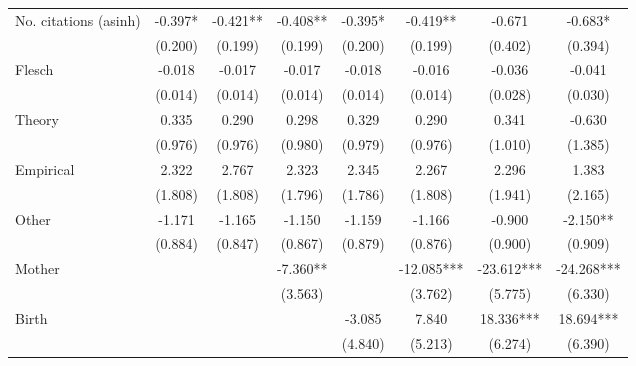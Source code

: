 \begin{table}
\begin{adjustwidth}{-0.085cm}{}
\begin{threeparttable}
\begin{tabular}{p{2.64cm}SSSSSSS}
            No. citations (asinh)         &      -0.397*  &      -0.421** &      -0.408** &      -0.395*  &      -0.419** &      -0.671   &      -0.683*  \\
                                          &     (0.200)   &     (0.199)   &     (0.199)   &     (0.200)   &     (0.199)   &     (0.402)   &     (0.394)   \\
            Flesch                        &      -0.018   &      -0.017   &      -0.017   &      -0.018   &      -0.016   &      -0.036   &      -0.041   \\
                                          &     (0.014)   &     (0.014)   &     (0.014)   &     (0.014)   &     (0.014)   &     (0.028)   &     (0.030)   \\
            Theory                        &       0.335   &       0.290   &       0.298   &       0.329   &       0.290   &       0.341   &      -0.630   \\
                                          &     (0.976)   &     (0.976)   &     (0.980)   &     (0.979)   &     (0.976)   &     (1.010)   &     (1.385)   \\
            Empirical                     &       2.322   &       2.767   &       2.323   &       2.345   &       2.267   &       2.296   &       1.383   \\
                                          &     (1.808)   &     (1.808)   &     (1.796)   &     (1.786)   &     (1.808)   &     (1.941)   &     (2.165)   \\
            Other                         &      -1.171   &      -1.165   &      -1.150   &      -1.159   &      -1.166   &      -0.900   &      -2.150** \\
                                          &     (0.884)   &     (0.847)   &     (0.867)   &     (0.879)   &     (0.876)   &     (0.900)   &     (0.909)   \\
            Mother                        &               &               &      -7.360** &               &     -12.085***&     -23.612***&     -24.268***\\
                                          &               &               &     (3.563)   &               &     (3.762)   &     (5.775)   &     (6.330)   \\
            Birth                         &               &               &               &      -3.085   &       7.840   &      18.336***&      18.694***\\
                                          &               &               &               &     (4.840)   &     (5.213)   &     (6.274)   &     (6.390)   \\

\end{tabular}
\end{threeparttable}
\end{adjustwidth}
\end{table}

